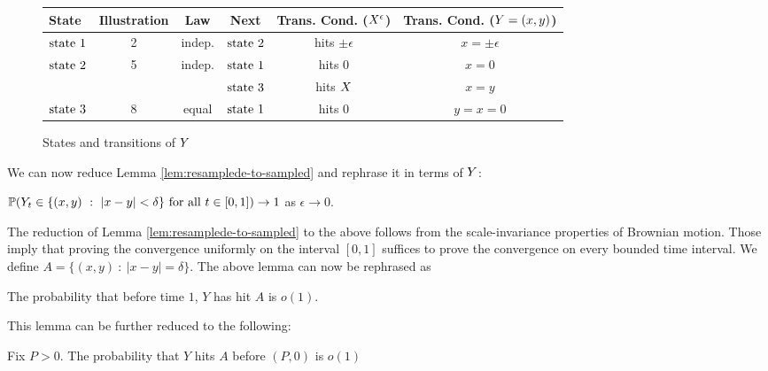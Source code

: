 {\begin{figure}\label{fig:twodimtranstab}
\begin{center}
  \begin{tabular}{| l || c | c | c | c | c | }
    \hline
    State & Illustration & Law & Next & Trans. Cond. ($X^{\epsilon}$) & Trans. Cond. ($Y=(x,y)$) \\
    \hline
    \hline
    $\text{state }1$ & 2 & indep. & $\text{state }2$ & hits $\pm\epsilon$ & $x=\pm\epsilon$ \\
    \hline
    \multirow{2}{*}{$\text{state }2$} & \multirow{2}{*}{5} & \multirow{2}{*}{indep.} & $\text{state }1$ & hits $0$ & $x=0$ \\ \cline{4-6}
        &  &  & $\text{state }3$ & hits $X$ & $x=y$\\
    \hline
    $\text{state }3$  & 8 & equal & $\text{state }1$ &  hits $0$ & $y=x=0$\\
    \hline
  \end{tabular}
\end{center}
\caption{States and transitions of $Y$}
\end{figure}

We can now reduce Lemma \ref{lem:resamplede-to-sampled} and rephrase it in terms of $Y$:
\begin{lemma*}
$\P(\twodim_t \in \{(x,y) \ :\  |x-y|<\delta \} \text{ for all } t \in [0,1])\to1$ as $\epsilon\to 0$.
\end{lemma*}
The reduction of Lemma \ref{lem:resamplede-to-sampled} to the above
follows from the scale-invariance properties of Brownian motion. Those
imply that proving the convergence uniformly on the interval $[0,1]$
suffices to prove the convergence on every bounded time interval.
\newcommand{\boundarylines}{A}
We define $\boundarylines=\{(x,y) \ :\  |x-y|=\delta \}$.
The above lemma can now be rephrased as 
\begin{lemma*}
  The probability that before time $1$, $Y$ has hit $\boundarylines$
  is $o(1)$.
\end{lemma*}

This lemma can be further reduced to the following:
\newcommand{\farpoint}{(P,0)}
\newcommand{\probhitboundaryis}[1]{Fix $P > 0$.  The probability that $Y$
  hits $\boundarylines$ before $\farpoint$ is #1}

\begin{lemma}\label{lem:prob-hit-boundary-o1}
  \probhitboundaryis{$o(1)$}
\end{lemma}

}

